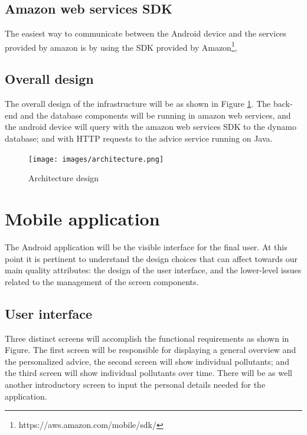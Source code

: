 \subsection{Amazon web services SDK}
The easiest way to communicate between the Android device and the services provided by amazon is by using the SDK provided by Amazon\footnote{https://aws.amazon.com/mobile/sdk/}, 

\subsection{Overall design}
The overall design of the infrastructure will be as shown in Figure \ref{fig:architecture}. The back-end and the database components will be running in amazon web services, and the android device will query with the amazon web services SDK to the dynamo database; and with HTTP requests to the advice service running on Java.

\begin{figure}[H]
\begin{adjustbox}{width=.8\textwidth,center=\textwidth}
  \centering
  \texttt{[image: images/architecture.png]}
\end{adjustbox}
  \caption[Architecture design]{Architecture design}
  \label{fig:architecture}
\end{figure}

\section{Mobile application}
The Android application will be the visible interface for the final user. At this point it is pertinent to understand the design choices that can affect towards our main quality attributes: the design of the user interface, and the lower-level issues related to the management of the screen components. 

\subsection{User interface}
Three distinct screens will accomplish the functional requirements as shown in Figure. The first screen will be responsible for displaying a general overview and the personalized advice, the second screen will show individual pollutants; and the third screen will show individual pollutants over time. There will be as well another introductory screen to input the personal details needed for the application.


